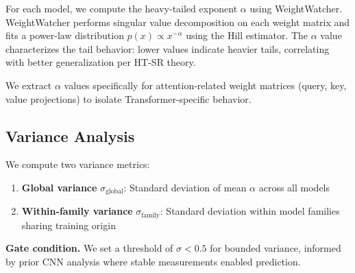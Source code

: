 For each model, we compute the heavy-tailed exponent $\alpha$ using WeightWatcher. WeightWatcher performs singular value decomposition on each weight matrix and fits a power-law distribution $p(x) \propto x^{-\alpha}$ using the Hill estimator. The $\alpha$ value characterizes the tail behavior: lower values indicate heavier tails, correlating with better generalization per HT-SR theory.

We extract $\alpha$ values specifically for attention-related weight matrices (query, key, value projections) to isolate Transformer-specific behavior.

\subsection{Variance Analysis}

We compute two variance metrics:

\begin{enumerate}
    \item \textbf{Global variance} $\sigma_{\text{global}}$: Standard deviation of mean $\alpha$ across all models
    \item \textbf{Within-family variance} $\sigma_{\text{family}}$: Standard deviation within model families sharing training origin
\end{enumerate}

\textbf{Gate condition.} We set a threshold of $\sigma < 0.5$ for bounded variance, informed by prior CNN analysis where stable measurements enabled prediction.
